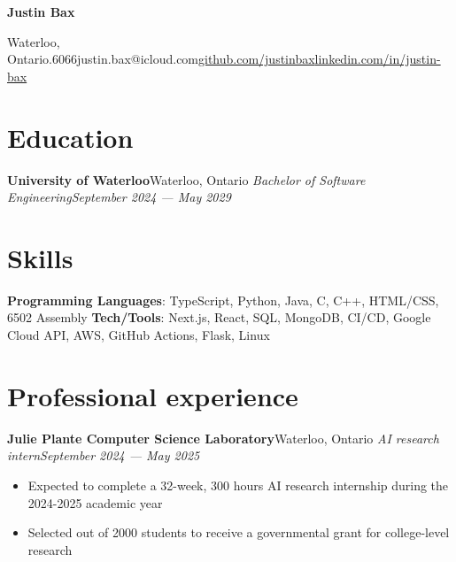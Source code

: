 \documentclass{article}
\newcommand{\cdelim}{\;\textbar\;}
\newcommand{\newrole}[4]{
    {\normalfont\textbf{#1}\hfill#3}
    \newline
    \textit{#2}\hfill\textit{#4}
}
\newenvironment{bulletpoints}{\begin{itemize}\setlength\itemsep{-0.3em}}{\end{itemize}}
\begin{document}
\begin{center}
    {\Huge\bfseries Justin Bax}\\\vspace*{2pt}

    Waterloo, Ontario\cdelim 438.763.6066\cdelim justin.bax@icloud.com\cdelim\href{https://github.com/justinbax}{github.com/justinbax}\cdelim\href{https://linkedin.com/in/justin-bax}{linkedin.com/in/justin-bax}\\
\end{center}

\section*{Education}

\newrole{University of Waterloo}{Bachelor of Software Engineering}{Waterloo, Ontario}{September 2024 --- May 2029}


\section*{Skills}

{\bfseries Programming Languages}: TypeScript, Python, Java, C, C++, HTML/CSS, 6502 Assembly
\newline
{\bfseries Tech/Tools}: Next.js, React, SQL, MongoDB, CI/CD, Google Cloud API, AWS, GitHub Actions, Flask, Linux


\section*{Professional experience}

\newrole{Julie Plante Computer Science Laboratory}{AI research intern}{Waterloo, Ontario}{September 2024 --- May 2025}
\begin{bulletpoints}
    \item Expected to complete a 32-week, 300 hours AI research internship during the 2024-2025 academic year
    \item Selected out of 2000 students to receive a governmental grant for college-level research
\end{bulletpoints}
\end{document}
